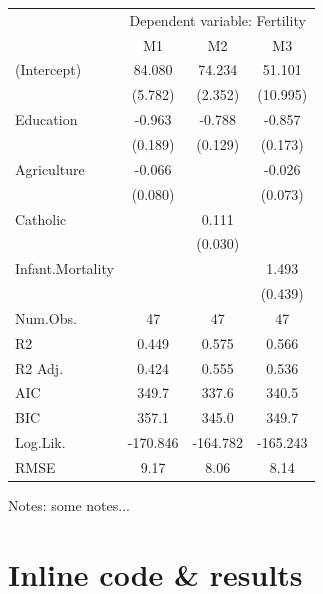 \documentclass[
  letterpaper,
  DIV=11,
  numbers=noendperiod]{scrartcl}
\begin{document}
\setlength{\LTpost}{0mm}
\begin{longtable}{lccc}
\toprule
 & \multicolumn{3}{c}{Dependent variable: Fertility} \\ 
\cmidrule(lr){2-4}
  & M1 & M2 & M3 \\ 
\midrule
(Intercept) & 84.080 & 74.234 & 51.101 \\ 
 & (5.782) & (2.352) & (10.995) \\ 
Education & -0.963 & -0.788 & -0.857 \\ 
 & (0.189) & (0.129) & (0.173) \\ 
Agriculture & -0.066 &  & -0.026 \\ 
 & (0.080) &  & (0.073) \\ 
Catholic &  & 0.111 &  \\ 
 &  & (0.030) &  \\ 
Infant.Mortality &  &  & 1.493 \\ 
 &  &  & (0.439) \\ 
Num.Obs. & 47 & 47 & 47 \\ 
R2 & 0.449 & 0.575 & 0.566 \\ 
R2 Adj. & 0.424 & 0.555 & 0.536 \\ 
AIC & 349.7 & 337.6 & 340.5 \\ 
BIC & 357.1 & 345.0 & 349.7 \\ 
Log.Lik. & -170.846 & -164.782 & -165.243 \\ 
RMSE & 9.17 & 8.06 & 8.14 \\ 
\bottomrule
\end{longtable}
\begin{minipage}{\linewidth}
Notes: some notes...\\
\end{minipage}

\hypertarget{inline-code-results}{%
\section{Inline code \& results}\label{inline-code-results}}
\end{document}
